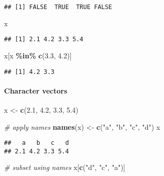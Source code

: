 \documentclass[
]{book}
\newenvironment{Shaded}{\begin{snugshade}}{\end{snugshade}}
\newcommand{\CommentTok}[1]{\textcolor[rgb]{0.56,0.35,0.01}{\textit{#1}}}
\newcommand{\FloatTok}[1]{\textcolor[rgb]{0.00,0.00,0.81}{#1}}
\newcommand{\KeywordTok}[1]{\textcolor[rgb]{0.13,0.29,0.53}{\textbf{#1}}}
\newcommand{\NormalTok}[1]{#1}
\newcommand{\OperatorTok}[1]{\textcolor[rgb]{0.81,0.36,0.00}{\textbf{#1}}}
\newcommand{\StringTok}[1]{\textcolor[rgb]{0.31,0.60,0.02}{#1}}
\begin{document}
\begin{verbatim}
## [1] FALSE  TRUE  TRUE FALSE
\end{verbatim}

\begin{Shaded}
\begin{Highlighting}[]
\NormalTok{x}
\end{Highlighting}
\end{Shaded}

\begin{verbatim}
## [1] 2.1 4.2 3.3 5.4
\end{verbatim}

\begin{Shaded}
\begin{Highlighting}[]
\NormalTok{x[x }\OperatorTok{\%in\%}\StringTok{ }\KeywordTok{c}\NormalTok{(}\FloatTok{3.3}\NormalTok{, }\FloatTok{4.2}\NormalTok{)]}
\end{Highlighting}
\end{Shaded}

\begin{verbatim}
## [1] 4.2 3.3
\end{verbatim}

\hypertarget{character-vectors}{%
\paragraph{Character vectors}\label{character-vectors}}

\begin{Shaded}
\begin{Highlighting}[]
\NormalTok{x \textless{}{-}}\StringTok{ }\KeywordTok{c}\NormalTok{(}\FloatTok{2.1}\NormalTok{, }\FloatTok{4.2}\NormalTok{, }\FloatTok{3.3}\NormalTok{, }\FloatTok{5.4}\NormalTok{)}

\CommentTok{\# apply names}
\KeywordTok{names}\NormalTok{(x) \textless{}{-}}\StringTok{ }\KeywordTok{c}\NormalTok{(}\StringTok{"a"}\NormalTok{, }\StringTok{"b"}\NormalTok{, }\StringTok{"c"}\NormalTok{, }\StringTok{"d"}\NormalTok{)}
\NormalTok{x}
\end{Highlighting}
\end{Shaded}

\begin{verbatim}
##   a   b   c   d 
## 2.1 4.2 3.3 5.4
\end{verbatim}

\begin{Shaded}
\begin{Highlighting}[]
\CommentTok{\# subset using names}
\NormalTok{x[}\KeywordTok{c}\NormalTok{(}\StringTok{"d"}\NormalTok{, }\StringTok{"c"}\NormalTok{, }\StringTok{"a"}\NormalTok{)]}
\end{Highlighting}
\end{Shaded}
\end{document}

